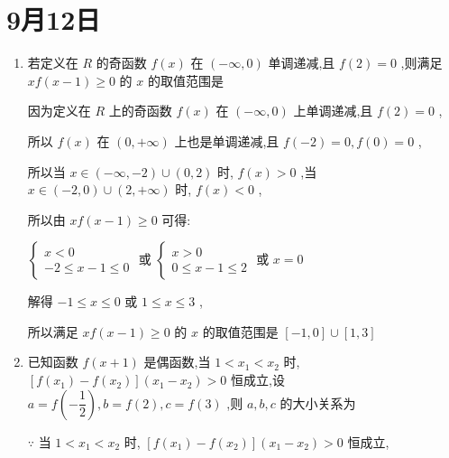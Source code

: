 \section*{9月12日}
\begin{enumerate}
    \item 若定义在 $R$ 的奇函数 $f\left( x\right)$ 在 $\left( {-\infty ,0}\right)$ 单调递减,且 $f\left( 2\right)  = 0$ ,则满足 ${xf}\left( {x - 1}\right)  \geq  0$ 的 $x$ 的取值范围是
    \begin{jieda}
        因为定义在 $R$ 上的奇函数 $f\left( x\right)$ 在 $\left( {-\infty ,0}\right)$ 上单调递减,且 $f\left( 2\right)  = 0$ ,
        
        所以 $f\left( x\right)$ 在 $\left( {0, + \infty }\right)$ 上也是单调递减,且 $f\left( {-2}\right)  = 0,f\left( 0\right)  = 0$ ,
        
        所以当 $x \in  \left( {-\infty , - 2}\right)  \cup  \left( {0,2}\right)$ 时, $f\left( x\right)  > 0$ ,当 $x \in  \left( {-2,0}\right)  \cup  \left( {2, + \infty }\right)$ 时, $f\left( x\right)  < 0$ ,
        
        所以由 ${xf}\left( {x - 1}\right)  \geq  0$ 可得:
        
        $\left\{  {\begin{array}{l} x < 0 \\   - 2 \leq  x - 1 \leq  0 \end{array}\text{ 或 }\left\{  {\begin{array}{l} x > 0 \\  0 \leq  x - 1 \leq  2 \end{array}\text{ 或 }x = 0}\right. }\right.$
        
        解得 $- 1 \leq  x \leq  0$ 或 $1 \leq  x \leq  3$ ,
        
        所以满足 ${xf}\left( {x - 1}\right)  \geq  0$ 的 $x$ 的取值范围是 $\left\lbrack  {-1,0}\right\rbrack   \cup  \left\lbrack  {1,3}\right\rbrack$
    \end{jieda}
    \item 已知函数 $f\left( {x + 1}\right)$ 是偶函数,当 $1 < {x}_{1} < {x}_{2}$ 时, $\left\lbrack  {f\left( {x}_{1}\right)  - f\left( {x}_{2}\right) }\right\rbrack  \left( {{x}_{1} - {x}_{2}}\right)  > 0$ 恒成立,设 $a = f\left( {-\dfrac{1}{2}}\right) ,b = f\left( 2\right) ,c = f\left( 3\right)$ ,则 $a,b,c$ 的大小关系为
    \begin{jieda}
        $\because$ 当 $1 < {x}_{1} < {x}_{2}$ 时, $\left\lbrack  {f\left( {x}_{1}\right)  - f\left( {x}_{2}\right) }\right\rbrack  \left( {{x}_{1} - {x}_{2}}\right)  > 0$ 恒成立,
        

\end{jieda}
\end{enumerate}
